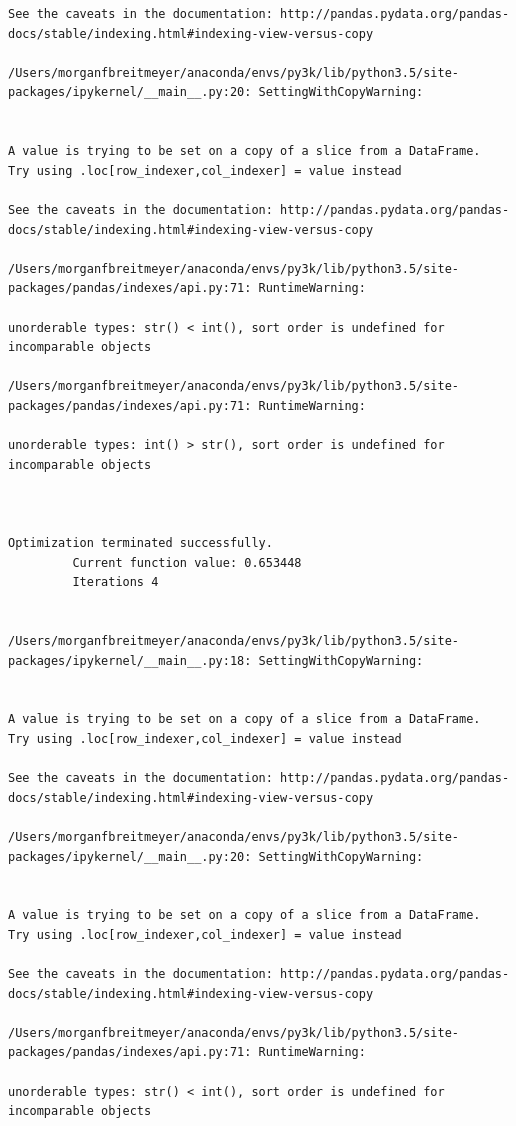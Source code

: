 \begin{lstlisting}
See the caveats in the documentation: http://pandas.pydata.org/pandas-docs/stable/indexing.html#indexing-view-versus-copy

/Users/morganfbreitmeyer/anaconda/envs/py3k/lib/python3.5/site-packages/ipykernel/__main__.py:20: SettingWithCopyWarning:


A value is trying to be set on a copy of a slice from a DataFrame.
Try using .loc[row_indexer,col_indexer] = value instead

See the caveats in the documentation: http://pandas.pydata.org/pandas-docs/stable/indexing.html#indexing-view-versus-copy

/Users/morganfbreitmeyer/anaconda/envs/py3k/lib/python3.5/site-packages/pandas/indexes/api.py:71: RuntimeWarning:

unorderable types: str() < int(), sort order is undefined for incomparable objects

/Users/morganfbreitmeyer/anaconda/envs/py3k/lib/python3.5/site-packages/pandas/indexes/api.py:71: RuntimeWarning:

unorderable types: int() > str(), sort order is undefined for incomparable objects



Optimization terminated successfully.
         Current function value: 0.653448
         Iterations 4


/Users/morganfbreitmeyer/anaconda/envs/py3k/lib/python3.5/site-packages/ipykernel/__main__.py:18: SettingWithCopyWarning:


A value is trying to be set on a copy of a slice from a DataFrame.
Try using .loc[row_indexer,col_indexer] = value instead

See the caveats in the documentation: http://pandas.pydata.org/pandas-docs/stable/indexing.html#indexing-view-versus-copy

/Users/morganfbreitmeyer/anaconda/envs/py3k/lib/python3.5/site-packages/ipykernel/__main__.py:20: SettingWithCopyWarning:


A value is trying to be set on a copy of a slice from a DataFrame.
Try using .loc[row_indexer,col_indexer] = value instead

See the caveats in the documentation: http://pandas.pydata.org/pandas-docs/stable/indexing.html#indexing-view-versus-copy

/Users/morganfbreitmeyer/anaconda/envs/py3k/lib/python3.5/site-packages/pandas/indexes/api.py:71: RuntimeWarning:

unorderable types: str() < int(), sort order is undefined for incomparable objects


\end{lstlisting}

